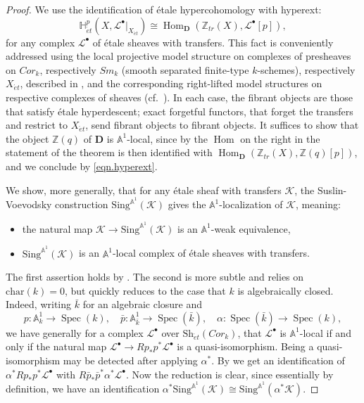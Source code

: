 \documentclass[12pt,reqno]{amsart}
\theoremstyle{plain}
\theoremstyle{remark}
\theoremstyle{definition}
\numberwithin{equation}{section}
\newcommand{\A}{{\mathbb A}}
\newcommand{\Z}{{\mathbb Z}}
\newcommand{\cK}{{\mathcal K}}
\newcommand{\cL}{{\mathcal L}}
\newcommand{\bA}{{\mathbb A}}
\newcommand{\bZ}{{\mathbb Z}}
\DeclareMathOperator{\Spec}{Spec}
\DeclareMathOperator{\Hom}{Hom}
\begin{document}
\begin{proof}
We use the identification of \'etale hypercohomology with hyperext:
\begin{equation}
\label{eqn.hyperext}
\mathbb{H}^p_{\acute et}(X,\cL^\bullet|_{X_{\acute et}})\cong \Hom_{\mathbf{D}}(\bZ_{tr}(X),\cL^\bullet[p]),
\end{equation}
for any complex $\cL^\bullet$ of \'etale sheaves with transfers.
This fact \cite[Exer.\ 6.25]{weibel}
is conveniently addressed using
the local projective model structure on complexes of presheaves on $Cor_k$, respectively $Sm_k$ (smooth separated finite-type $k$-schemes), respectively $X_{\acute et}$, described in \cite[\S 5.2]{choudhurygallauer}, and the
corresponding
right-lifted model structures
on respective complexes of sheaves
(cf.\ \cite[Cor.\ 2.7]{GKR}).
In each case, the fibrant objects are those that satisfy \'etale hyperdescent;
exact forgetful functors, that forget the transfers and restrict to $X_{\acute et}$,
send fibrant objects to fibrant objects.
It suffices to show that the object $\bZ(q)$ of $\mathbf{D}$ is $\A^1$-local, since by \cite[Lemma 9.19]{weibel} the $\Hom$ on the right in the statement of the theorem is then identified with
$\Hom_{\mathbf{D}}(\Z_{tr}(X),\bZ(q)[p])$,
and we conclude by \eqref{eqn.hyperext}.

We show, more generally, that for any \'etale sheaf with transfers $\cK$, the Suslin-Voevodsky construction
$\mathrm{Sing}^{\bA^1}(\cK)$ gives the $\A^1$-localization of $\cK$, meaning:
\begin{itemize}
\item the natural map $\cK\to \mathrm{Sing}^{\bA^1}(\cK)$ is an $\A^1$-weak equivalence,
\item $\mathrm{Sing}^{\bA^1}(\cK)$ is an $\A^1$-local complex of \'etale sheaves with transfers.
\end{itemize}
The first assertion holds by \cite[Lemma 9.15]{weibel}.
The second is more subtle and relies on $\mathrm{char}(k)=0$, but quickly reduces to the case that $k$ is algebraically closed.
Indeed, writing $\bar k$ for an algebraic closure and
\[ p\colon \A^1_k\to \Spec(k),\quad \bar p\colon \A^1_{\bar k}\to \Spec(\bar k),\quad
\alpha\colon \Spec(\bar k)\to \Spec(k), \]
we have generally for a complex $\cL^\bullet$ over $\mathrm{Sh}_{\acute et}(Cor_k)$, that
$\cL^\bullet$ is $\A^1$-local if and only if the natural map $\cL^\bullet\to Rp_*p^*\cL^\bullet$ is a quasi-isomorphism.
Being a quasi-isomorphism may be detected after applying $\alpha^*$.
By \cite[Lemme 4.2]{ayoubrealisation} we get an identification of $\alpha^*Rp_*p^*\cL^\bullet$ with $R\bar p_*\bar p^*\alpha^*\cL^\bullet$.
Now the reduction is clear, since essentially by definition, we have an identification
$\alpha^*\mathrm{Sing}^{\bA^1}(\cK)\cong \mathrm{Sing}^{\bA^1}(\alpha^*\cK)$.


\end{proof}
\end{document}
